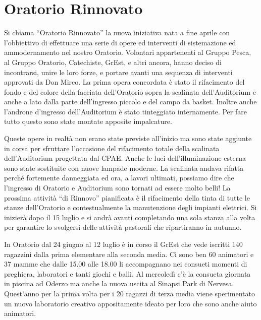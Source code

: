 \section{Oratorio Rinnovato}



Si chiama ``Oratorio Rinnovato'' la nuova iniziativa nata a fine aprile con l’obbiettivo di effettuare una serie di opere ed interventi di sistemazione ed ammodernamento nel nostro Oratorio. Volontari appartenenti al Gruppo Pesca, al Gruppo Oratorio, Catechiste, GrEst, e altri ancora, hanno deciso di incontrarsi, unire le loro forze, e portare avanti una sequenza di interventi approvati da Don Mirco. La prima opera concordata è stato il rifacimento del fondo e del colore della facciata dell’Oratorio sopra la scalinata dell’Auditorium e anche a lato dalla parte dell’ingresso piccolo e del campo da basket.
Inoltre anche l’androne d’ingresso dell’Auditorium è stato tinteggiato internamente. Per fare tutto questo sono state montate apposite impalcature.

Queste opere in realtà non erano state previste all’inizio ma sono state aggiunte in corsa per sfruttare l’occasione del rifacimento totale della scalinata dell’Auditorium progettata dal CPAE. Anche le luci dell’illuminazione esterna sono state sostituite con nuove lampade moderne. La scalinata andava rifatta perché fortemente danneggiata ed ora, a lavori ultimati, possiamo dire che l’ingresso di Oratorio e Auditorium sono tornati ad essere molto belli!  La prossima attività ``di Rinnovo'' pianificata è il rifacimento della tinta di tutte le stanze dell’Oratorio e contestualmente la manutenzione degli impianti elettrici. Si inizierà dopo il 15 luglio e si andrà avanti completando una sola stanza alla volta per garantire lo svolgersi delle attività pastorali che ripartiranno in autunno.



In Oratorio dal 24 giugno al 12 luglio è in corso il GrEst che vede iscritti 140 ragazzini dalla prima elementare alla seconda media. Ci sono ben 60 animatori e 37 mamme che dalle 15.00 alle 18.00 li accompagnano nei consueti momenti di preghiera, laboratori e tanti giochi e balli. Al mercoledì c’è la consueta giornata in piscina ad Oderzo ma anche la nuova uscita al Sinapsi Park di Nervesa. Quest’anno per la prima volta per i 20 ragazzi di terza media viene sperimentato un nuovo laboratorio creativo appositamente ideato per loro che sono anche aiuto animatori.



